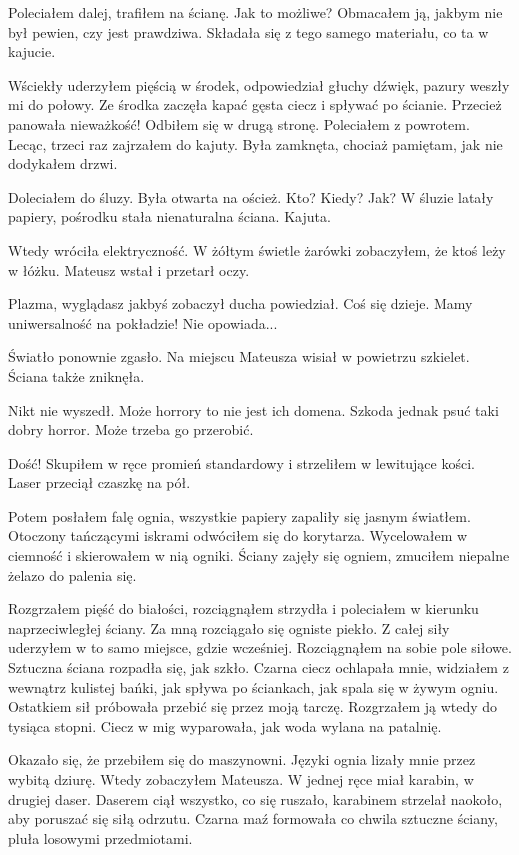Poleciałem dalej, trafiłem na ścianę. Jak to możliwe?
Obmacałem ją, jakbym nie był pewien, czy jest prawdziwa.
Składała się z tego samego materiału, co ta w kajucie.

Wściekły uderzyłem pięścią w środek, odpowiedział głuchy dźwięk, pazury weszły mi do połowy.
Ze środka zaczęła kapać gęsta ciecz i spływać po ścianie.
Przecież panowała nieważkość!
Odbiłem się w drugą stronę. Poleciałem z powrotem.
Lecąc, trzeci raz zajrzałem do kajuty.
Była zamknęta, chociaż pamiętam, jak nie dodykałem drzwi.

Doleciałem do śluzy. Była otwarta na oścież.
Kto? Kiedy? Jak?
W śluzie latały papiery, pośrodku stała nienaturalna ściana. Kajuta.

Wtedy wróciła elektryczność.
W żółtym świetle żarówki zobaczyłem, że ktoś leży w łóżku.
Mateusz wstał i przetarł oczy.
\begin{dialogue}
\ds{} Plazma, wyglądasz jakbyś zobaczył ducha \dm{} powiedział.
\ds{} Coś się dzieje. Mamy uniwersalność na pokładzie!
\ds{} Nie opowiada...
\end{dialogue}

Światło ponownie zgasło.
Na miejscu Mateusza wisiał w powietrzu szkielet.
Ściana także zniknęła.

\divider{} 

Nikt nie wyszedł. Może horrory to nie jest ich domena. 
Szkoda jednak psuć taki dobry horror. 
Może trzeba go przerobić.

\divider{}

Dość!
Skupiłem w ręce promień standardowy i strzeliłem w lewitujące kości.
Laser przeciął czaszkę na pół.

Potem posłałem falę ognia, wszystkie papiery zapaliły się jasnym światłem.
Otoczony tańczącymi iskrami odwóciłem się do korytarza.
Wycelowałem w ciemność i skierowałem w nią ogniki.
Ściany zajęły się ogniem, zmuciłem niepalne żelazo do palenia się.

Rozgrzałem pięść do białości, rozciągnąłem strzydła i poleciałem w kierunku naprzeciwległej ściany.
Za mną rozciągało się ogniste piekło.
Z całej siły uderzyłem w to samo miejsce, gdzie wcześniej.
Rozciągnąłem na sobie pole siłowe.
Sztuczna ściana rozpadła się, jak szkło. Czarna ciecz ochlapała mnie, widziałem z wewnątrz kulistej bańki, jak spływa po ściankach, jak spala się w żywym ogniu.
Ostatkiem sił próbowała przebić się przez moją tarczę. Rozgrzałem ją wtedy do tysiąca stopni. Ciecz w mig wyparowała, jak woda wylana na patalnię.

Okazało się, że przebiłem się do maszynowni.
Języki ognia lizały mnie przez wybitą dziurę.
Wtedy zobaczyłem Mateusza. 
W jednej ręce miał karabin, w drugiej daser.
Daserem ciął wszystko, co się ruszało, karabinem strzelał naokoło, aby poruszać się siłą odrzutu.
Czarna maź formowała co chwila sztuczne ściany, pluła losowymi przedmiotami. 

